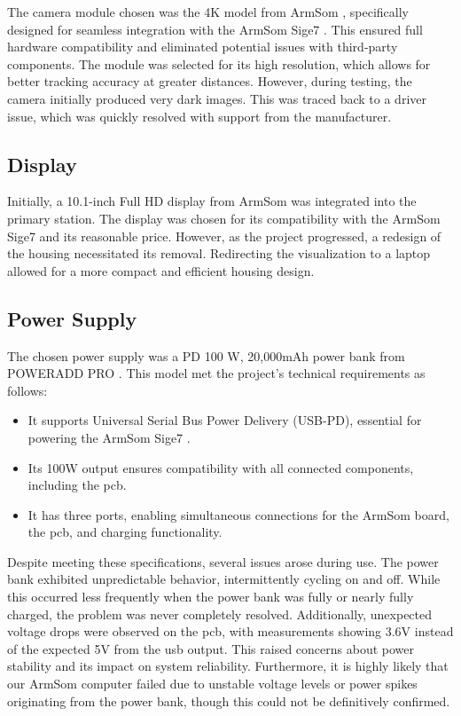 The camera module chosen was the 4K model from ArmSom \cite{armsom_camera_module}, specifically designed for seamless integration with the ArmSom Sige7 \cite{armsom_sige7}. This ensured full hardware compatibility and eliminated potential issues with third-party components. The module was selected for its high resolution, which allows for better tracking accuracy at greater distances. However, during testing, the camera initially produced very dark images. This was traced back to a driver issue, which was quickly resolved with support from the manufacturer.

\subsection{Display}

Initially, a 10.1-inch Full HD display from ArmSom \cite{armsom_display} was integrated into the primary station. The display was chosen for its compatibility with the ArmSom Sige7 \cite{armsom_sige7} and its reasonable price. However, as the project progressed, a redesign of the housing necessitated its removal. Redirecting the visualization to a laptop allowed for a more compact and efficient housing design.

\subsection{Power Supply}

The chosen power supply was a PD 100 W, 20,000mAh power bank from POWERADD PRO \cite{poweradd_pro_powerbank}. This model met the project's technical requirements as follows:
\begin{itemize}
	\item It supports Universal Serial Bus Power Delivery (USB-PD), essential for powering the ArmSom Sige7 \cite{armsom_sige7}.
	\item Its 100W output ensures compatibility with all connected components, including the \acrshort{pcb}.
	\item It has three ports, enabling simultaneous connections for the ArmSom board, the \acrshort{pcb}, and charging functionality.
\end{itemize}

Despite meeting these specifications, several issues arose during use. The power bank exhibited unpredictable behavior, intermittently cycling on and off. While this occurred less frequently when the power bank was fully or nearly fully charged, the problem was never completely resolved. Additionally, unexpected voltage drops were observed on the \acrshort{pcb}, with measurements showing 3.6V instead of the expected 5V from the \acrfull{usb} output. This raised concerns about power stability and its impact on system reliability. Furthermore, it is highly likely that our ArmSom computer failed due to unstable voltage levels or power spikes originating from the power bank, though this could not be definitively confirmed.

